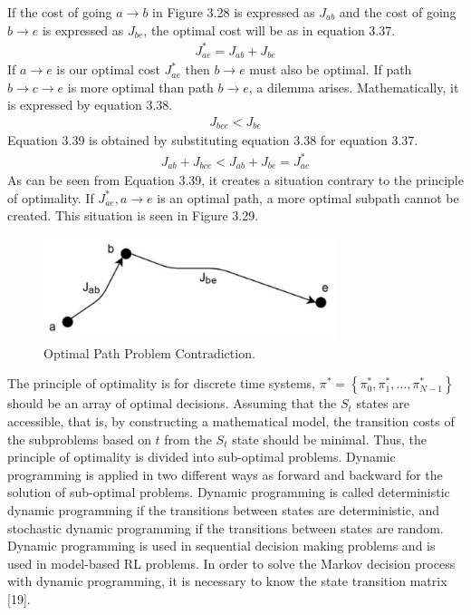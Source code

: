 \documentclass[12pt,twoside,a4]{mwbk}
\begin{document}
\noindent If the cost of going $a \rightarrow b$ in Figure 3.28 is expressed as $J_{a b}$ and the cost of going $b \rightarrow e$ is expressed as $J_{b e}$, the optimal cost will be as in equation 3.37.
\begin{subequations}
\begin{align}
   J_{a e}^{*}=J_{a b}+J_{b e}
\end{align}
\end{subequations}
If $a \rightarrow e$ is our optimal cost $J_{a e}^{*}$ then $b \rightarrow e$ must also be optimal. If path $b \rightarrow c \rightarrow e$ is more optimal than path $b \rightarrow e$, a dilemma arises. Mathematically, it is expressed by equation 3.38.
\begin{subequations}
\begin{align}
   J_{b c e}<J_{b e}
\end{align}
\end{subequations}
Equation 3.39 is obtained by substituting equation 3.38 for equation 3.37.
\begin{subequations}
\begin{align}
   J_{a b}+J_{b c e}<J_{a b}+J_{b e}=J_{a e}^{*}
\end{align}
\end{subequations}
As can be seen from Equation 3.39, it creates a situation contrary to the principle of optimality. If $J_{a e}^{*}, a \rightarrow e$ is an optimal path, a more optimal subpath cannot be created. This situation is seen in Figure 3.29.
\begin{figure}[h]
    \centering
    \includegraphics[width=8.5 cm, height=3.0cm]{optimal_path_1.jpg}
    \caption{Optimal Path Problem Contradiction.}
\end{figure}

\noindent The principle of optimality is for discrete time systems, $\pi^{*}=\left\{\pi_{0}^{*}, \pi_{1}^{*}, \ldots, \pi_{N-1}^ {*}\right\}$ should be an array of optimal decisions. Assuming that the $S_{t}$ states are accessible, that is, by constructing a mathematical model, the transition costs of the subproblems based on $t$ from the $S_{t}$ state should be minimal. Thus, the principle of optimality is divided into sub-optimal problems. Dynamic programming is applied in two different ways as forward and backward for the solution of sub-optimal problems. Dynamic programming is called deterministic dynamic programming if the transitions between states are deterministic, and stochastic dynamic programming if the transitions between states are random. Dynamic programming is used in sequential decision making problems and is used in model-based RL problems. In order to solve the Markov decision process with dynamic programming, it is necessary to know the state transition matrix [19].
\end{document}
